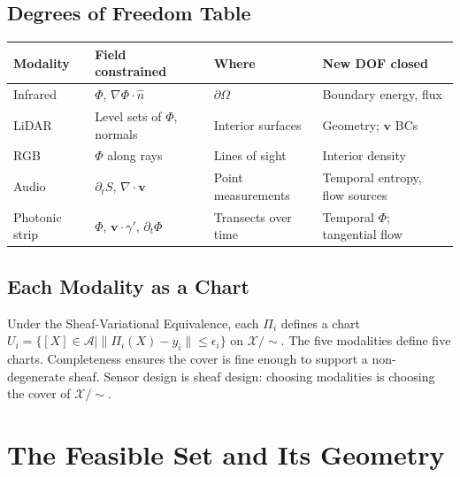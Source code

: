 \documentclass[11pt, oneside]{article}
\newcommand{\Xmod}{\mathcal{X}/{\sim}}
\begin{document}
\subsection{Degrees of Freedom Table}

\begin{center}
\begin{tabular}{llll}
\toprule
\textbf{Modality} & \textbf{Field constrained} & \textbf{Where} &
\textbf{New DOF closed} \\
\midrule
Infrared & $\Phi$, $\nabla\Phi \cdot \hat{n}$ & $\partial\Omega$ &
Boundary energy, flux \\
LiDAR & Level sets of $\Phi$, normals & Interior surfaces &
Geometry; $\mathbf{v}$ BCs \\
RGB & $\Phi$ along rays & Lines of sight &
Interior density \\
Audio & $\partial_t S$, $\nabla \cdot \mathbf{v}$ & Point measurements &
Temporal entropy, flow sources \\
Photonic strip & $\Phi$, $\mathbf{v} \cdot \gamma'$, $\partial_t \Phi$ &
Transects over time & Temporal $\Phi$; tangential flow \\
\bottomrule
\end{tabular}
\end{center}

\subsection{Each Modality as a Chart}

Under the Sheaf-Variational Equivalence, each $\Pi_i$ defines a chart
$U_i = \{[X] \in \mathcal{A} \mid \|\Pi_i(X) - y_i\| \le \epsilon_i\}$ on $\Xmod$.
The five modalities define five charts. Completeness ensures the cover is fine enough
to support a non-degenerate sheaf. Sensor design is sheaf design: choosing modalities
is choosing the cover of $\Xmod$.

\section{The Feasible Set and Its Geometry}
\label{sec:feasible}
\end{document}
